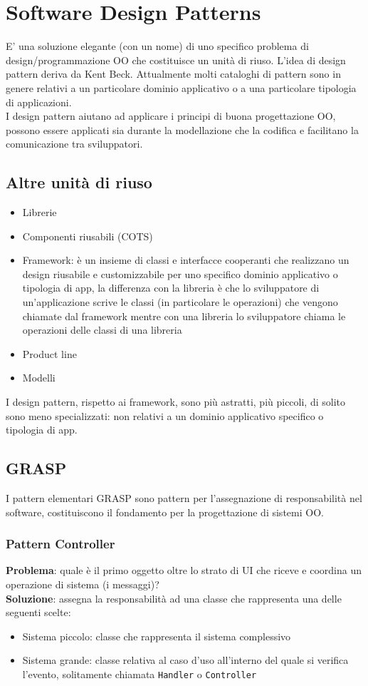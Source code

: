 \documentclass[12pt, a4paper]{report}
\begin{document}
\chapter{Software Design Patterns}
E' una soluzione elegante (con un nome) di uno specifico problema di design/programmazione OO che costituisce un unità di riuso. L'idea di design pattern deriva da Kent Beck. Attualmente molti cataloghi di pattern sono in genere relativi a un particolare dominio applicativo o a una particolare tipologia di applicazioni.\\
I design pattern aiutano ad applicare i principi di buona progettazione OO, possono essere applicati sia durante la modellazione che la codifica e facilitano la comunicazione tra sviluppatori.
\section{Altre unità di riuso}
\begin{itemize}
    \item Librerie
    \item Componenti riusabili (COTS)
    \item Framework: è un insieme di classi e interfacce cooperanti che realizzano un design riusabile e customizzabile per uno specifico dominio applicativo o tipologia di app, la differenza con la libreria è che lo sviluppatore di un'applicazione scrive le classi (in particolare le operazioni) che vengono chiamate dal framework mentre con una libreria lo sviluppatore chiama le operazioni delle classi di una libreria
    \item Product line
    \item Modelli
\end{itemize}
I design pattern, rispetto ai framework, sono più astratti, più piccoli, di solito sono meno specializzati: non relativi a un dominio applicativo specifico o tipologia di app.
\section{GRASP}
I pattern elementari GRASP sono pattern per l'assegnazione di responsabilità nel software, costituiscono il fondamento per la progettazione di sistemi OO.
\subsection{Pattern Controller}
\textbf{Problema}: quale è il primo oggetto oltre lo strato di UI che riceve e coordina un operazione di sistema (i messaggi)?\\
\textbf{Soluzione}: assegna la responsabilità ad una classe che rappresenta una delle seguenti scelte:
\begin{itemize}
    \item Sistema piccolo: classe che rappresenta il sistema complessivo
    \item Sistema grande: classe relativa al caso d'uso all'interno del quale si verifica l'evento, solitamente chiamata \texttt{Handler} o \texttt{Controller}
\end{itemize}
\end{document}
